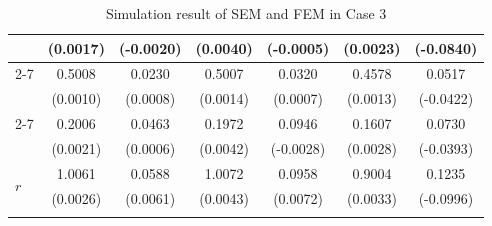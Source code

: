 \documentclass[11pt]{article}
\begin{document}
{\begin{table}[h!]
{\begin{minipage}{0.65\textwidth}
\begin{tabular}{lcccccc}
 & (0.0017) & (-0.0020) & (0.0040) & (-0.0005) & (0.0023) & (-0.0840) \\
        \cmidrule{2-7}
         & 0.5008 & 0.0230 & 0.5007 & 0.0320 & 0.4578 & 0.0517 \\
 & (0.0010) & (0.0008) & (0.0014) & (0.0007) & (0.0013) & (-0.0422) \\
        \cmidrule{2-7}
         & 0.2006 & 0.0463 & 0.1972 & 0.0946 & 0.1607 & 0.0730 \\
 & (0.0021) & (0.0006) & (0.0042) & (-0.0028) & (0.0028) & (-0.0393) \\
        \midrule
        \multirow{2}{*}{$r$} & 1.0061 & 0.0588 & 1.0072 & 0.0958 & 0.9004 & 0.1235 \\
 & (0.0026) & (0.0061) & (0.0043) & (0.0072) & (0.0033) & (-0.0996) \\
        \hhline{=======}
        \end{tabular}
    \end{minipage}
}
\caption{Simulation result of SEM and FEM in Case 3}\label{tab:AppSimExoCase3}
\end{table}

}
\end{document}
